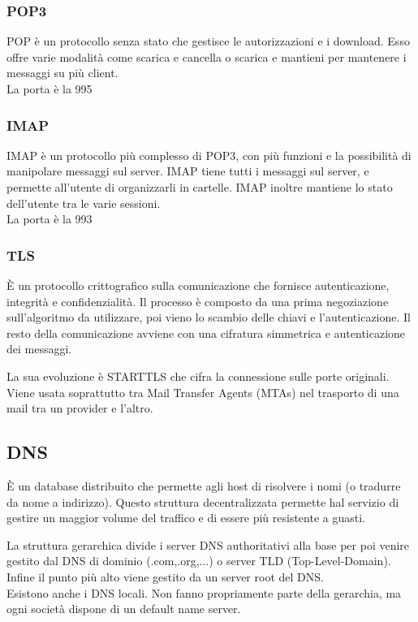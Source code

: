 \documentclass[12pt, a4paper]{article}
\begin{document}
\subsubsection{POP3}
POP è un protocollo senza stato che gestisce le autorizzazioni e i download. Esso offre varie modalità come scarica e cancella
o scarica e mantieni per mantenere i messaggi su più client.\\La porta è la 995
\subsubsection{IMAP}
IMAP è un protocollo più complesso di POP3, con più funzioni e la possibilità di manipolare messaggi sul server.
IMAP tiene tutti i messaggi sul server, e permette all'utente di organizzarli in cartelle. IMAP inoltre mantiene 
lo stato dell'utente tra le varie sessioni.\\La porta è la 993

\subsubsection{TLS}
È un protocollo crittografico sulla comunicazione che fornisce autenticazione, integrità e confidenzialità. Il processo è 
composto da una prima negoziazione sull'algoritmo da utilizzare, poi vieno lo scambio delle chiavi e l'autenticazione. Il 
resto della comunicazione avviene con una cifratura simmetrica e autenticazione dei messaggi.

La sua evoluzione è STARTTLS che cifra la connessione sulle porte originali. Viene usata soprattutto tra Mail Transfer
Agents (MTAs) nel trasporto di una mail tra un provider e l'altro.

\subsection{DNS}
È un database distribuito che permette agli host di risolvere i nomi (o tradurre da nome a indirizzo). Questo struttura 
decentralizzata permette hal servizio di gestire un maggior volume del traffico e di essere più resistente a guasti.

La struttura gerarchica divide i server DNS authoritativi alla base per poi venire gestito dal DNS di dominio (.com,.org,...)
o server TLD (Top-Level-Domain). Infine il punto più alto viene gestito da un server root del DNS.\\
Esistono anche i DNS locali. Non fanno propriamente parte della gerarchia, ma ogni società dispone di un default name server.
\end{document}

